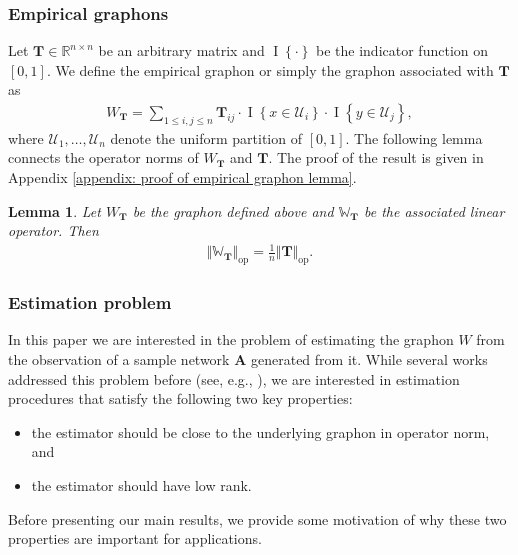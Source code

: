 \documentclass[11pt]{article}
\newcommand{\bbR}{\mathbb{R}}
\newcommand{\U}{\mathcal{U}}
\newcommand{\op}{\mathrm{op}}
\newcommand{\bbW}{\mathbb{W}}
\newcommand{\bT}{\bm{T}}
\newcommand{\indicator}[1]{{\operatorname{I} \left \{ #1\right \}}}
\newcommand{\<}{\langle}
\renewcommand{\>}{\rangle}
\theoremstyle{plain}
\newtheorem{lemma}{Lemma}
\theoremstyle{definition}
\theoremstyle{remark}
\begin{document}
\subsubsection*{Empirical graphons}
Let $\bT \in \bbR^{n \times n}$ be an arbitrary matrix  and $\indicator{\cdot}$ be the indicator function on $[0,1]$. We define the empirical graphon or simply the graphon associated with $\bT$ as 
\begin{align*}
	W_{\bT} = \sum_{1 \le i, j \le n} \bT_{ij} \cdot \indicator{x \in \U_i} \cdot \indicator{y \in \U_j},
\end{align*}
where $\U_1, \dots, \U_n$ denote the uniform partition of $[0,1]$. 
The following lemma connects the operator norms of $W_{\bT}$ and $\bT$. The proof of the result is given in Appendix \ref{appendix: proof of empirical graphon lemma}. 
\begin{lemma}
\label{lemma: empirical graphon norm}
    Let $W_{\bT}$ be the graphon defined above and $\bbW_{\bT}$ be the associated linear operator. Then
    \begin{align*}
        \Vert \bbW_{\bT} \Vert_{\op} = \frac{1}{n} \Vert \bT \Vert_{\op}. 
    \end{align*}
\end{lemma}

\subsubsection*{Estimation problem}
In this paper we are interested in the  problem of estimating the graphon $W$ from the observation of a  sample network $\bm{A}$ generated from it. While several works addressed this problem before (see, e.g., \citep{chatterjee2012,gao2014rate,klopp2017,klopp2019, xu2017}), we are  interested in estimation procedures that satisfy the following two key properties:
\begin{itemize}
    \item [(P1)] \label{P1} the estimator should be close to the underlying graphon in operator norm, and
    \item [(P2)] \label{P2} the estimator should have low rank. 
\end{itemize}
Before presenting our main results, we provide some motivation of why these two properties are important for applications.
\end{document}
